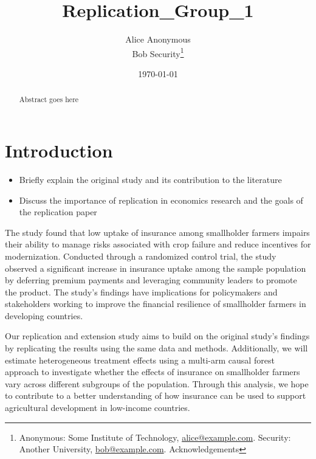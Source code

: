 \documentclass[AER]{AEA}
\begin{document}
\title{Replication\_Group\_1}


\author{
  Alice Anonymous\\
  Bob Security\thanks{
  Anonymous: Some Institute of
Technology, \href{mailto:alice@example.com}{alice@example.com}.
  Security: Another
University, \href{mailto:bob@example.com}{bob@example.com}.
  Acknowledgements
}
}

\date{\today}

\begin{abstract}
Abstract goes here
\end{abstract}


\maketitle

\section{Introduction}

\begin{itemize}

\item  Briefly explain the original study and its contribution to the literature

\item  Discuss the importance of replication in economics research and the goals of the replication paper

\end{itemize}

The study found that low uptake of insurance among smallholder farmers
impairs their ability to manage risks associated with crop failure and
reduce incentives for modernization. Conducted through a randomized
control trial, the study observed a significant increase in insurance
uptake among the sample population by deferring premium payments and
leveraging community leaders to promote the product. The study's
findings have implications for policymakers and stakeholders working to
improve the financial resilience of smallholder farmers in developing
countries.

Our replication and extension study aims to build on the original
study's findings by replicating the results using the same data and
methods. Additionally, we will estimate heterogeneous treatment effects
using a multi-arm causal forest approach to investigate whether the
effects of insurance on smallholder farmers vary across different
subgroups of the population. Through this analysis, we hope to
contribute to a better understanding of how insurance can be used to
support agricultural development in low-income countries.
\end{document}
